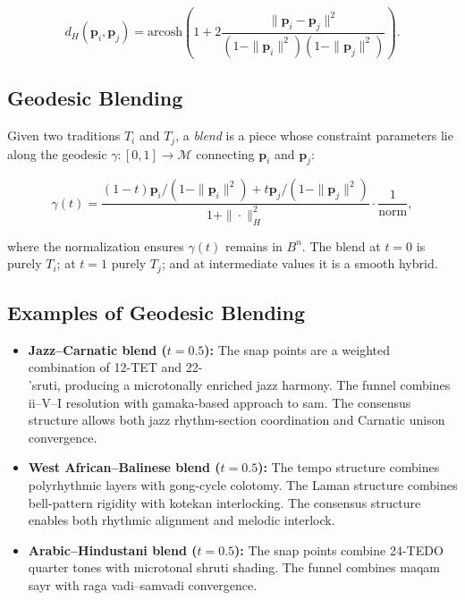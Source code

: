 \documentclass[cmj]{article}
\begin{document}
\begin{equation}
  d_H(\mathbf{p}_i, \mathbf{p}_j) = \mathrm{arcosh}\!\left(1 + 2
  \frac{\|\mathbf{p}_i - \mathbf{p}_j\|^2}{(1 - \|\mathbf{p}_i\|^2)(1 -
  \|\mathbf{p}_j\|^2)}\right).
  \label{eq:hyperbolic-distance}
\end{equation}

\subsection{Geodesic Blending}

Given two traditions $T_i$ and $T_j$, a \emph{blend} is a piece whose
constraint parameters lie along the geodesic $\gamma: [0, 1] \to \mathcal{M}$
connecting $\mathbf{p}_i$ and $\mathbf{p}_j$:

\begin{equation}
  \gamma(t) = \frac{(1-t)\mathbf{p}_i / (1 - \|\mathbf{p}_i\|^2) +
  t \mathbf{p}_j / (1 - \|\mathbf{p}_j\|^2)}
  {1 + \|\cdot\|^2_{H}} \cdot \frac{1}{\text{norm}},
  \label{eq:geodesic}
\end{equation}

where the normalization ensures $\gamma(t)$ remains in $B^n$. The blend at
$t = 0$ is purely $T_i$; at $t = 1$ purely $T_j$; and at intermediate values
it is a smooth hybrid.

\subsection{Examples of Geodesic Blending}

\begin{itemize}[nosep]
  \item \textbf{Jazz--Carnatic blend ($t = 0.5$):} The snap points are a
    weighted combination of 12-TET and 22-\\'{s}ruti, producing a
    microtonally enriched jazz harmony. The funnel combines ii--V--I
    resolution with gamaka-based approach to sam. The consensus structure
    allows both jazz rhythm-section coordination and Carnatic unison
    convergence.
  \item \textbf{West African--Balinese blend ($t = 0.5$):} The tempo
    structure combines polyrhythmic layers with gong-cycle colotomy. The
    Laman structure combines bell-pattern rigidity with kotekan interlocking.
    The consensus structure enables both rhythmic alignment and melodic
    interlock.
  \item \textbf{Arabic--Hindustani blend ($t = 0.5$):} The snap points
    combine 24-TEDO quarter tones with microtonal shruti shading. The funnel
    combines maqam sayr with raga vadi--samvadi convergence.
\end{itemize}
\end{document}
